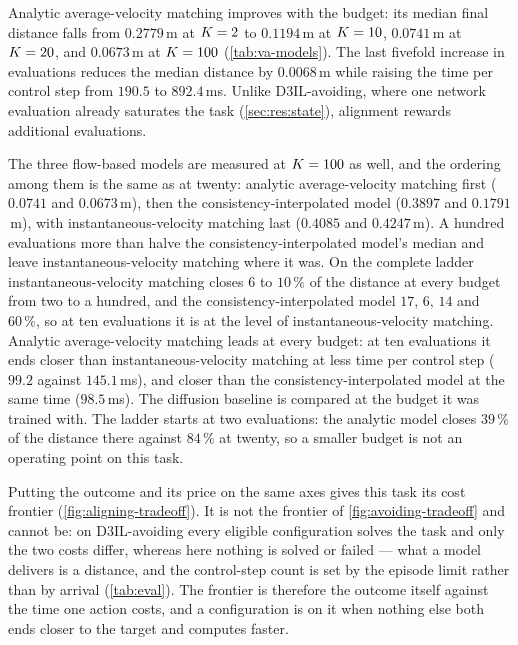 Analytic average-velocity matching improves with the budget: its median final distance falls from
$0.2779$\,m at $K=2$ to $0.1194$\,m at $K=10$, $0.0741$\,m at $K=20$, and
$0.0673$\,m at $K=100$ (\autoref{tab:va-models}). The last fivefold increase in evaluations reduces the median distance by
$0.0068$\,m while raising the time per control step from $190.5$ to $892.4$\,ms. Unlike D3IL-avoiding,
where one network evaluation already saturates the task (\autoref{sec:res:state}), alignment rewards
additional evaluations.

The three flow-based models are measured at $K=100$ as well, and the ordering among them is the same as
at twenty: analytic average-velocity matching first ($0.0741$ and $0.0673$\,m), then the
consistency-interpolated model ($0.3897$ and $0.1791$\,m), with instantaneous-velocity matching last
($0.4085$ and $0.4247$\,m). A hundred evaluations more than halve the consistency-interpolated model's
median and leave instantaneous-velocity matching where it was. On the complete ladder
instantaneous-velocity matching closes $6$ to $10\,\%$ of the distance at every budget from two to a hundred,
and the consistency-interpolated model $17$, $6$, $14$ and $60\,\%$, so at ten evaluations it is at the
level of instantaneous-velocity matching. Analytic average-velocity matching leads at every budget: at ten
evaluations it ends closer than instantaneous-velocity matching at less time per control step ($99.2$
against $145.1$\,ms), and closer than the consistency-interpolated model at the same time ($98.5$\,ms). The diffusion baseline is compared at the
budget it was trained with. The ladder starts at two evaluations: the analytic model closes $39\,\%$ of
the distance there against $84\,\%$ at twenty, so a smaller budget is not an operating point on this
task.

Putting the outcome and its price on the same axes gives this task its cost frontier
(\autoref{fig:aligning-tradeoff}). It is not the frontier of \autoref{fig:avoiding-tradeoff} and cannot
be: on D3IL-avoiding every eligible configuration solves the task and only the two costs differ, whereas
here nothing is solved or failed --- what a model delivers is a distance, and the control-step count is
set by the episode limit rather than by arrival (\autoref{tab:eval}). The frontier is therefore the
outcome itself against the time one action costs, and a configuration is on it when nothing else both
ends closer to the target and computes faster.

